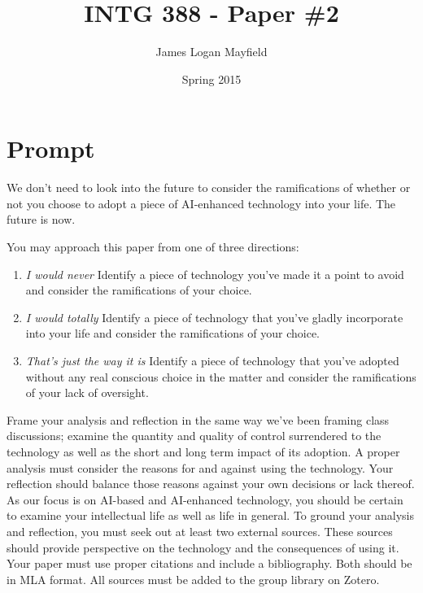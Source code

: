 \documentclass[]{tufte-handout}
\title{INTG 388 - Paper \#2 }
\author{James Logan Mayfield}
\date{ Spring 2015 }
\begin{document}
\maketitle

\section{Prompt}

We don't need to look into the future to consider the ramifications of whether or not you choose to adopt a piece of AI-enhanced technology into your life.  The future is now.  

You may approach this paper from one of three directions:
\begin{enumerate}
\item \textit{I would never} \newline
Identify a piece of technology you've made it a point to avoid and consider the ramifications of your choice.

\item \textit{I would totally} \newline
Identify a piece of technology that you've gladly incorporate into your life and consider the ramifications of your choice. 

\item \textit{That's just the way it is} \newline
Identify a piece of technology that you've adopted without any real conscious choice in the matter and consider the ramifications of your lack of oversight. 
\end{enumerate}

Frame your analysis and reflection in the same way we've been framing class discussions; examine the quantity and quality of control surrendered to the  technology as well as the short and long term impact of its adoption. A proper analysis must consider the reasons for and against using the technology. Your reflection should balance those reasons against your own decisions or lack thereof. As our focus is on AI-based and AI-enhanced technology, you should be certain to examine your intellectual life as well as life in general. To ground your analysis and reflection, you must seek out at least two external sources. These sources should provide perspective on the technology and the consequences of using it. Your paper must use proper citations and include a bibliography. Both should be in MLA format. All sources must be added to the group library on Zotero.
\end{document}
